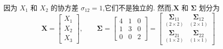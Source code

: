 因为 $X_1$ 和 $X_2$ 的协方差 $\sigma_{12}=1$,它们不是独立的. 然而,$\mathbf{X}$ 和 $\boldsymbol{\Sigma}$ 划分为
\[
\mathbf{X}=\begin{bmatrix}X_1\\X_2\\X_3\end{bmatrix},\qquad
\boldsymbol{\Sigma}=\begin{bmatrix}4&1&0\\1&3&0\\0&0&2\end{bmatrix}=\begin{bmatrix}\underset{(2\times2)}{\boldsymbol{\Sigma}_{11}}&\underset{(2\times1)}{\boldsymbol{\Sigma}_{12}}\\\underset{(1\times2)}{\boldsymbol{\Sigma}_{21}}&\underset{(1\times1)}{\boldsymbol{\Sigma}_{22}}\end{bmatrix}
\]

